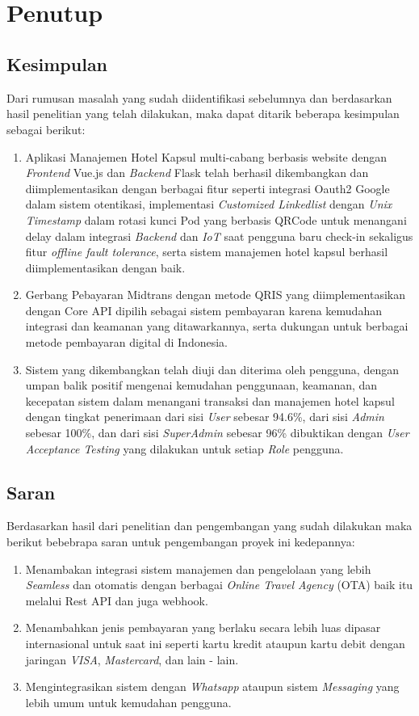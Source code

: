\chapter[Penutup]{\\Penutup}

\section{Kesimpulan}
Dari rumusan masalah yang sudah diidentifikasi sebelumnya dan berdasarkan hasil penelitian yang telah dilakukan, maka dapat ditarik beberapa kesimpulan sebagai berikut:
\begin{enumerate}
    \item Aplikasi Manajemen Hotel Kapsul multi-cabang berbasis website dengan \textit{Frontend} Vue.js dan \textit{Backend} Flask telah berhasil dikembangkan dan diimplementasikan dengan berbagai fitur seperti integrasi Oauth2 Google dalam sistem otentikasi, implementasi \textit{Customized Linkedlist} dengan \textit{Unix Timestamp} dalam rotasi kunci Pod yang berbasis QRCode untuk menangani delay dalam integrasi \textit{Backend} dan \textit{IoT} saat pengguna baru check-in sekaligus fitur \textit{offline fault tolerance}, serta sistem manajemen hotel kapsul berhasil diimplementasikan dengan baik.
    \item Gerbang Pebayaran Midtrans dengan metode QRIS yang diimplementasikan dengan Core API dipilih sebagai sistem pembayaran karena kemudahan integrasi dan keamanan yang ditawarkannya, serta dukungan untuk berbagai metode pembayaran digital di Indonesia.
    \item Sistem yang dikembangkan telah diuji dan diterima oleh pengguna, dengan umpan balik positif mengenai kemudahan penggunaan, keamanan, dan kecepatan sistem dalam menangani transaksi dan manajemen hotel kapsul dengan tingkat penerimaan dari sisi \textit{User} sebesar 94.6\%, dari sisi \textit{Admin} sebesar 100\%, dan dari sisi \textit{SuperAdmin} sebesar 96\% dibuktikan dengan \textit{User Acceptance Testing} yang dilakukan untuk setiap \textit{Role} pengguna.
\end{enumerate}

\section{Saran}
Berdasarkan hasil dari penelitian dan pengembangan yang sudah dilakukan maka berikut bebebrapa saran untuk pengembangan proyek ini kedepannya:
\begin{enumerate}
    \item Menambakan integrasi sistem manajemen dan pengelolaan yang lebih \textit{Seamless} dan otomatis dengan berbagai \textit{Online Travel Agency} (OTA) baik itu melalui Rest API dan juga webhook.
    \item Menambahkan jenis pembayaran yang berlaku secara lebih luas dipasar internasional untuk saat ini seperti kartu kredit ataupun kartu debit dengan jaringan \textit{VISA}, \textit{Mastercard}, dan lain - lain.
    \item Mengintegrasikan sistem dengan \textit{Whatsapp} ataupun sistem \textit{Messaging} yang lebih umum untuk kemudahan pengguna.
\end{enumerate}